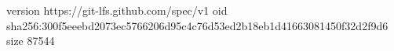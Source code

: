 version https://git-lfs.github.com/spec/v1
oid sha256:300f5eeebd2073ec5766206d95c4c76d53ed2b18eb1d41663081450f32d2f9d6
size 87544
